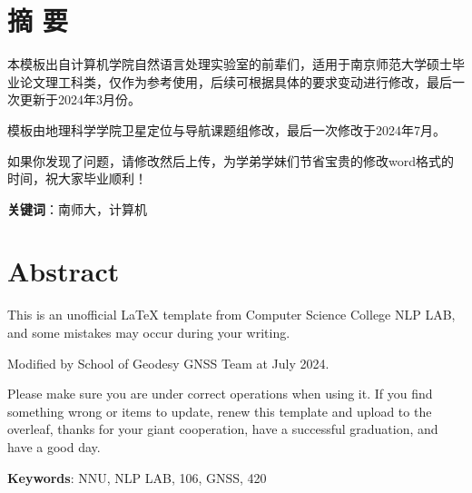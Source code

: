 
{\centering\section*{摘 \quad 要}}
{}
\pagestyle{fancy}
\fancyhf{}
\fancyfoot[CO, CE]{\thepage} %
本模板出自计算机学院自然语言处理实验室的前辈们，适用于南京师范大学硕士毕业论文理工科类，仅作为参考使用，后续可根据具体的要求变动进行修改，最后一次更新于2024年3月份。

模板由地理科学学院卫星定位与导航课题组修改，最后一次修改于2024年7月。

如果你发现了问题，请修改然后上传，为学弟学妹们节省宝贵的修改word格式的时间，祝大家毕业顺利！


\par\noindent\textbf{关键词}：南师大，计算机

\newpage %
{\centering\section*{Abstract}} 
{}%


This is an unofficial \LaTeX{} template from Computer Science College NLP LAB, and some mistakes may occur during your writing. 

Modified by School of Geodesy GNSS Team at July 2024.

Please make sure you are under correct operations when using it. If you find something wrong or items to update, renew this template and upload to the overleaf, thanks for your giant cooperation, have a successful graduation, and have a good day. 

\par\noindent\textbf{Keywords}: NNU, NLP LAB, 106, GNSS, 420